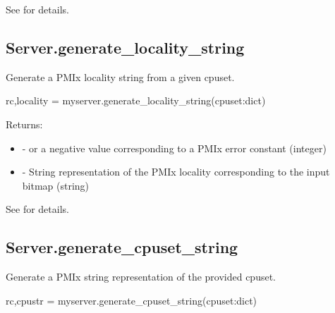 See  for details.


\subsection{Server.generate_locality_string}

\summary
Generate a PMIx locality string from a given cpuset.

\format

\pyspecificstart
\begin{codepar}
rc,locality = myserver.generate_locality_string(cpuset:dict)
\end{codepar}
\pyspecificend


\begin{arglist}
\end{arglist}

Returns:

\begin{itemize}
    \item {} -  or a negative value corresponding to a PMIx error constant (integer)
    \item {} - String representation of the PMIx locality corresponding to the input bitmap (string)
\end{itemize}

See  for details.

\subsection{Server.generate_cpuset_string}

\summary
Generate a PMIx string representation of the provided cpuset.

\format

\pyspecificstart
\begin{codepar}
rc,cpustr = myserver.generate_cpuset_string(cpuset:dict)
\end{codepar}
\pyspecificend


\begin{arglist}
\end{arglist}

